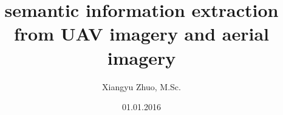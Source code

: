 \documentclass[%
  headings = standardclasses, %
]{tumDiss}
\title{%
 semantic information extraction from UAV imagery and aerial imagery\\
}
\author{Xiangyu Zhuo, M.Sc.}
\date{01.01.2016}
\begin{document}
\frontmatter
\maketitle









\tableofcontents
\listoffigures
\listoftables



\mainmatter


















\cleardoublepage
\begin{appendix}

%
%
\end{appendix}
\end{document}
